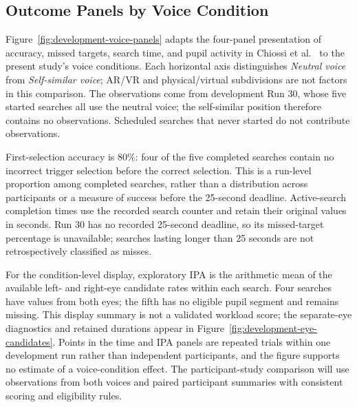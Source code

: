 \subsection{Outcome Panels by Voice Condition}
\label{sec:development-voice-panels}
Figure~\ref{fig:development-voice-panels} adapts the four-panel presentation of accuracy, missed targets, search time, and pupil activity in Chiossi et al.~\cite{chiossi2024searching} to the present study's voice conditions. Each horizontal axis distinguishes \emph{Neutral voice} from \emph{Self-similar voice}; AR/VR and physical/virtual subdivisions are not factors in this comparison. The observations come from development Run 30, whose five started searches all use the neutral voice; the self-similar position therefore contains no observations. Scheduled searches that never started do not contribute observations.

First-selection accuracy is 80\%: four of the five completed searches contain no incorrect trigger selection before the correct selection. This is a run-level proportion among completed searches, rather than a distribution across participants or a measure of success before the 25-second deadline. Active-search completion times use the recorded search counter and retain their original values in seconds. Run 30 has no recorded 25-second deadline, so its missed-target percentage is unavailable; searches lasting longer than 25 seconds are not retrospectively classified as misses.

For the condition-level display, exploratory IPA is the arithmetic mean of the available left- and right-eye candidate rates within each search. Four searches have values from both eyes; the fifth has no eligible pupil segment and remains missing. This display summary is not a validated workload score; the separate-eye diagnostics and retained durations appear in Figure~\ref{fig:development-eye-candidates}. Points in the time and IPA panels are repeated trials within one development run rather than independent participants, and the figure supports no estimate of a voice-condition effect. The participant-study comparison will use observations from both voices and paired participant summaries with consistent scoring and eligibility rules.

